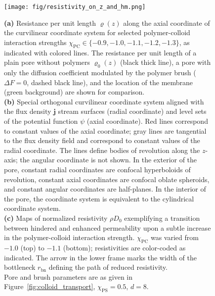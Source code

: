 \documentclass[12pt, a4paper]{article}
\begin{document}
\begin{figure}
    \centering
    \texttt{[image: fig/resistivity\_on\_z\_and\_hm.png]}
    \caption{
    \textbf{(a)} Resistance per unit length $\varrho(z)$ along the axial coordinate of the curvilinear coordinate system for selected polymer-colloid interaction strengths $\chi_{\text{PC}} \in \{ -0.9, -1.0, -1.1, -1.2, -1.3\}$, as indicated with colored lines.
    The resistance per unit length of a plain pore without polymers $\varrho_{0}(z)$ (black thick line), a pore with only the diffusion coefficient modulated by the polymer brush ($\Delta F = 0$, dashed black line), and the location of the membrane (green background) are shown for comparison.
    \\
    \textbf{(b)} Special orthogonal curvilinear coordinate system aligned with the flux density $\bm{j}$ stream surfaces (radial coordinate) and level sets of the potential function $\psi$ (axial coordinate).
    Red lines correspond to constant values of the axial coordinate; gray lines are tangential to the flux density field and correspond to constant values of the radial coordinate.
    The lines define bodies of revolution along the $z$-axis; the angular coordinate is not shown.
    In the exterior of the pore, constant radial coordinates are confocal hyperboloids of revolution, constant axial coordinates are confocal oblate spheroids, and constant angular coordinates are half-planes.
    In the interior of the pore, the coordinate system is equivalent to the cylindrical coordinate system.
    \\
    \textbf{(c)} Maps of normalized resistivity $\rho D_0$ exemplifying a transition between hindered and enhanced permeability upon a subtle increase in the polymer-colloid interaction strength.
    $\chi_{\text{PC}}$ was varied from $-1.0$ (top) to $-1.1$ (bottom); resistivities are color-coded as indicated.
    The arrow in the lower frame marks the width of the bottleneck $r_{\text{bn}}$ defining the path of reduced resistivity.\\
    Pore and brush parameters are as given in Figure~\ref{fig:colloid_transport}, $\chi_{\text{PS}}=0.5$, $d=8$.
    }
    \label{fig:R_map}
\end{figure}
\end{document}
